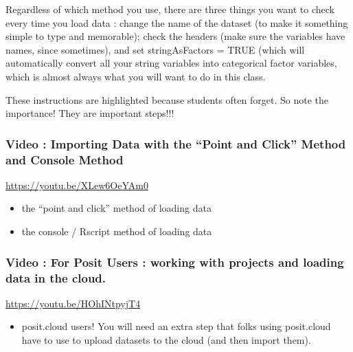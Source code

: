\documentclass[
  letterpaper,
  DIV=11,
  numbers=noendperiod,
  oneside]{scrreprt}
\providecommand{\tightlist}{%
  \setlength{\itemsep}{0pt}\setlength{\parskip}{0pt}}\usepackage{longtable,booktabs,array}
\begin{document}
\begin{tcolorbox}[enhanced jigsaw, toptitle=1mm, toprule=.15mm, rightrule=.15mm, breakable, left=2mm, colbacktitle=quarto-callout-important-color!10!white, colback=white, opacityback=0, coltitle=black, bottomtitle=1mm, opacitybacktitle=0.6, titlerule=0mm, leftrule=.75mm, arc=.35mm, bottomrule=.15mm, title=\textcolor{quarto-callout-important-color}{\faExclamation}\hspace{0.5em}{Important}, colframe=quarto-callout-important-color-frame]

Regardless of which method you use, there are three things you want to
check every time you load data : change the name of the dataset (to make
it something simple to type and memorable); check the headers (make sure
the variables have names, since sometimes), and set stringAsFactors =
TRUE (which will automatically convert all your string variables into
categorical factor variables, which is almost always what you will want
to do in this class.

These instructions are highlighted because students often forget. So
note the importance! They are important steps!!!

\end{tcolorbox}

\subsubsection{Video : Importing Data with the ``Point and Click''
Method and Console
Method}\label{video-importing-data-with-the-point-and-click-method-and-console-method}

\url{https://youtu.be/XLew6OeYAm0}

\begin{itemize}
\tightlist
\item
  the ``point and click'' method of loading data
\item
  the console / Rscript method of loading data
\end{itemize}

\subsubsection{Video : For Posit Users : working with projects and
loading data in the
cloud.}\label{video-for-posit-users-working-with-projects-and-loading-data-in-the-cloud.}

\url{https://youtu.be/HOhINtpyjT4}

\begin{itemize}
\tightlist
\item
  posit.cloud users! You will need an extra step that folks using
  posit.cloud have to use to upload datasets to the cloud (and then
  import them).
\end{itemize}
\end{document}
